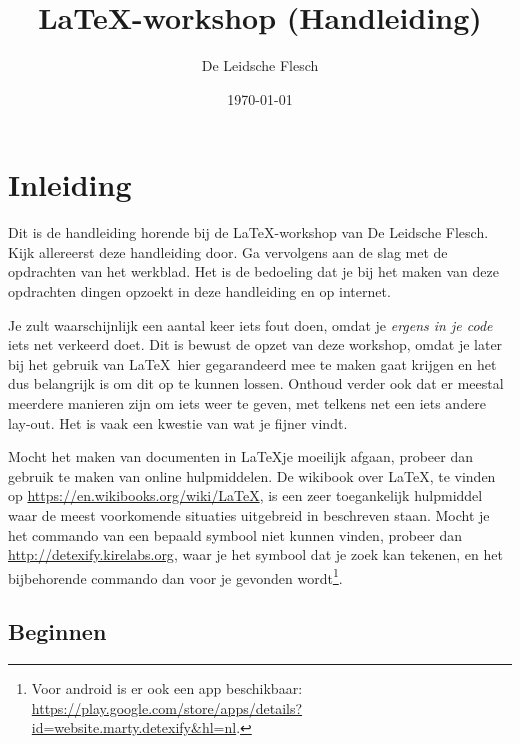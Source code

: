 \documentclass{article}
\title{\LaTeX-workshop (Handleiding)}
\author{De Leidsche Flesch}
\date{\today}
\begin{document}
\maketitle
\tableofcontents
\newpage

\section{Inleiding}

Dit is de handleiding horende bij de \LaTeX-workshop van De Leidsche Flesch.
Kijk allereerst deze handleiding door. Ga vervolgens aan de slag met de opdrachten van het werkblad. Het is
de bedoeling dat je bij het maken van deze opdrachten dingen opzoekt in deze handleiding en op internet. 

Je zult waarschijnlijk een aantal keer iets fout doen, omdat je \emph{ergens in
je code} iets net verkeerd doet. Dit is bewust de opzet van deze workshop, omdat
je later bij het gebruik van \LaTeX\ hier gegarandeerd mee te maken gaat krijgen
en het dus belangrijk is om dit op te kunnen lossen. Onthoud verder ook dat er
meestal meerdere manieren zijn om iets weer te geven, met telkens net een iets
andere lay-out. Het is vaak een kwestie van wat je fijner vindt.

Mocht het maken van documenten in \LaTeX je moeilijk afgaan, probeer dan gebruik te maken van online hulpmiddelen. De wikibook over \LaTeX, te vinden op \url{https://en.wikibooks.org/wiki/LaTeX}, is een zeer toegankelijk hulpmiddel waar de meest voorkomende situaties uitgebreid in beschreven staan. Mocht je het commando van een bepaald symbool niet kunnen vinden, probeer dan \url{http://detexify.kirelabs.org}, waar je het symbool dat je zoek kan tekenen, en het bijbehorende commando dan voor je gevonden wordt\footnote{Voor android is er ook een app beschikbaar: \url{https://play.google.com/store/apps/details?id=website.marty.detexify\&hl=nl}.}.

\subsection{Beginnen}
\end{document}
